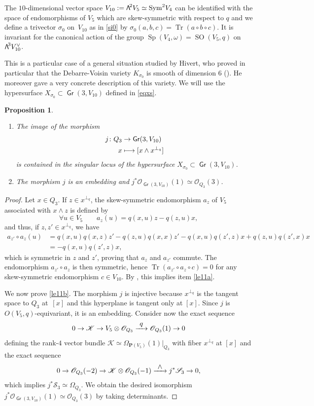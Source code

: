 \documentclass[11pt]{article}
\newcommand{\skpt}{\smallskip}
\let\mathcal\mathscr
\newenvironment{enumeratea}
{\bgroup\def\theenumi{\alph{enumi}}\def\theenumii{\arabic{enumii}}\begin{enumerate}}
{\end{enumerate}\egroup}
\newcommand\mto{\mathchoice{\longmapsto}{\mapsto}{\mapsto}{\mapsto}}
\newcommand\To[1]{\mathchoice{\xrightarrow{\textstyle\kern4pt#1\kern3pt}}{\stackrel{#1}{\longrightarrow}}{}{}}
\newtheorem{prop}[lemm]{Proposition}
\theoremstyle{definition}
\renewcommand\P{{\mathbf P}}\let\PP\P
\newcommand\cK{\mathcal{K}}
\newcommand\cO{\mathcal{O}}\let\OO\cO
\newcommand\cS{\mathcal{S}}\let\soustauto\cS
\DeclareMathOperator{\Gr}{\mathsf{Gr}}
\let\isom\simeq
\let\cong\simeq
\let\dual\vee
\DeclareMathOperator{\SO}{SO}
\DeclareMathOperator{\Sp}{Sp}
\DeclareMathOperator{\Sym}{Sym}
\DeclareMathOperator{\Tr}{Tr}
\newcommand\bw[1]{{\hbox{\large$\mathsf{\Lambda}$}^{\!#1}}}
\newcommand\Qtrois{{Q_3}}
\begin{document}
The $10$-dimensional vector space
$V_{10}:=\bw2V_5\cong \Sym^2\!V_4$
can be identified with the space of endomorphisms of $V_5$ which are skew-symmetric with respect to $q$ and we define
a trivector $\sigma_0$ on~$ V_{10}$ as in \eqref{si0} by
$\sigma_0(a,b,c)=\Tr(a\circ b\circ c)
$. It is invariant for the canonical action of the group $\Sp(V_4,\omega) =\SO(V_5,q)$ on $\bw3V_{10}^\dual $.

This is a particular case of a general situation studied by Hivert, who proved in particular that the Debarre-Voisin variety
$K_{\sigma_0}$
is smooth of dimension 6 (\cite[Def.\,1.2 \& Th.\,4.1]{hivert}). He moreover gave a very concrete description of this variety. We will use the hypersurface $X_{\sigma_0}\subset \Gr(3,V_{10})$ defined in \eqref{eqxs}.

\skpt
\begin{prop} \label{le11}
\begin{enumeratea}
\item\label{le11a}
The image of the morphism
\begin{align*}
j\colon \Qtrois&\to \Gr(3,V_{10})\\
x&\mto[ x\wedge x^{\perp_q}]
\end{align*}
is contained in the singular locus of the hypersurface $X_{\sigma_0}\subset \Gr(3,V_{10})$.

\item\label{le11b}
The morphism $j$ is an embedding and $j^*\cO_{\Gr(3,V_{10})}(1)\isom \cO_{\Qtrois}(3)$.
\end{enumeratea}
\end{prop}

\begin{proof} Let $x\in \Qtrois$. If $z\in x^{\perp_q}$, the skew-symmetric endomorphism $a_z $ of $V_5$ associated with $x\wedge z$ is defined by
\[
\forall u\in V_5\qquad a_z(u)=q(x,u)z-q(z,u)x,
\]
and thus, if $z,z'\in x^{\perp_q}$, we have
\begin{align*}
a_{z'}\circ a_z (u)&=q(x,u)q(x,z)z'-q(z,u)q(x,x)z'-q(x,u)q(z',z )x+q(z,u)q(z',x)x\\
&=-q(x,u)q(z',z )x,
\end{align*}
which is symmetric in $z$ and $z'$,
proving that $ a_z$ and $ a_{z'}$ commute. The endomorphism
$ a_{z'}\circ a_z$ is then symmetric, hence $\Tr( a_{z'}\circ a_z\circ c)=0$ for any skew-symmetric endomorphism $c\in V_{10}$.
By \cite[Prop.\,3.1]{devo}, this implies item \eqref{le11a}.

We now prove \eqref{le11b}. The morphism $j$ is injective because $x^{\perp_q}$ is the tangent space to $Q_3$ at~$[x]$ and this hyperplane is tangent only at $[x]$. Since $j$ is $O(V_5,q)$-equivariant, it is an embedding. Consider now the exact sequence
\[\label{eqprem2611}
0 \to \cK \to V_5\otimes \cO_{\Qtrois}\To{q} \cO_{\Qtrois}(1)\to 0
\]
defining the rank-$4$ vector bundle $\cK \isom\Omega_{\P(V_5)}(1)\vert_\Qtrois$ with fiber $x^{\perp_q}$ at $[x]$ and the exact sequence
\[\label{eqdeux2611}
0\to \cO_{\Qtrois}(-2) \to \cK\otimes \cO_{\Qtrois}(-1)\To{\wedge} j^*\cS_3\to 0
,\]
which implies $j^*\cS_3\isom \Omega_\Qtrois$. We obtain the desired isomorphism $j^*\cO_{\Gr(3,V_{10})}(1)\isom \cO_{\Qtrois}(3)$ by taking determinants.
\end{proof}
\end{document}
